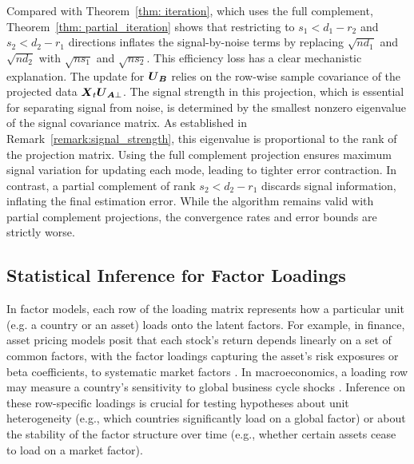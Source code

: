 \documentclass[11pt,letterpaper]{article}
\theoremstyle{definition}
\begin{document}
Compared with Theorem~\ref{thm: iteration}, which uses the full complement, Theorem~\ref{thm: partial_iteration} shows that restricting to $s_1 < d_1-r_2$ and $s_2 < d_2-r_1$ directions inflates the signal-by-noise terms by replacing $\sqrt{n d_1}$ and $\sqrt{n d_2}$ with $\sqrt{n s_1}$ and $\sqrt{n s_2}$. This efficiency loss has a clear mechanistic explanation. The update for $\boldsymbol{U}_{\boldsymbol{B}}$ relies on the row-wise sample covariance of the projected data $\boldsymbol{X}_t \boldsymbol{U}_{\boldsymbol{A}\perp}$. The signal strength in this projection, which is essential for separating signal from noise, is determined by the smallest nonzero eigenvalue of the signal covariance matrix. As established in Remark~\ref{remark:signal_strength}, this eigenvalue is proportional to the rank of the projection matrix. Using the full complement projection ensures maximum signal variation for updating each mode, leading to tighter error contraction. In contrast, a partial complement of rank $s_2 < d_2-r_1$ discards signal information, inflating the final estimation error. While the algorithm remains valid with partial complement projections, the convergence rates and error bounds are strictly worse.





\subsection{Statistical Inference for Factor Loadings}

In factor models, each row of the loading matrix represents how a particular unit (e.g. a country or an asset) loads onto the latent factors. For example, in finance, asset pricing models posit that each stock’s return depends linearly on a set of common factors, with the factor loadings capturing the asset’s risk exposures or beta coefficients, to systematic market factors \citep{ROSS1976341, connor1986performance,lettau2022high,giglio2022factor,conlon2025asset}. In macroeconomics, a loading row may measure a country's sensitivity to global business cycle shocks \citep{bai2003inferential,houssa2008monetary,forni2021policy}. Inference on these row-specific loadings is crucial for testing hypotheses about unit heterogeneity (e.g., which countries significantly load on a global factor) or about the stability of the factor structure over time (e.g., whether certain assets cease to load on a market factor). 
\end{document}
